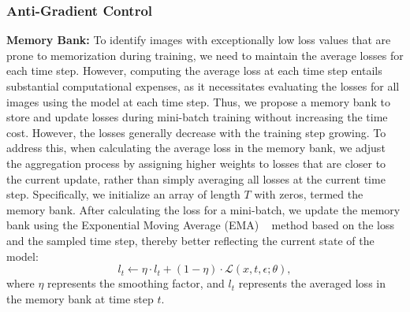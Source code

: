 \subsubsection{Anti-Gradient Control}
\textbf{Memory Bank:}
To identify images with exceptionally low loss values that are prone to memorization during training, we need to maintain the average losses for each time step. 
However, computing the average loss at each time step entails substantial computational expenses, as it necessitates evaluating the losses for all images using the model at each time step. Thus, we propose a memory bank to store and update losses during mini-batch training without increasing the time cost. However, 
the losses generally decrease with the training step growing. To address this, when calculating the average loss in the memory bank, we adjust the aggregation process by assigning higher weights to losses that are closer to the current update, rather than simply averaging all losses at the current time step.
Specifically, we initialize an array of length $T$ with zeros, termed the memory bank. 
After calculating the loss for a mini-batch, we update the memory bank using the Exponential Moving Average (EMA) ~\cite{polyak1992acceleration} method based on the loss and the sampled time step, thereby better reflecting the current state of the model:
\begin{equation}\label{eq:ema}
  l_{t} \leftarrow  \eta \cdot l_{t} + (1 - \eta) \cdot \mathcal{L} (x, t, \epsilon; \theta),
\end{equation}
where $\eta$ represents the smoothing factor, and $l_{t}$ represents the averaged loss in the memory bank at time step $t$. 

